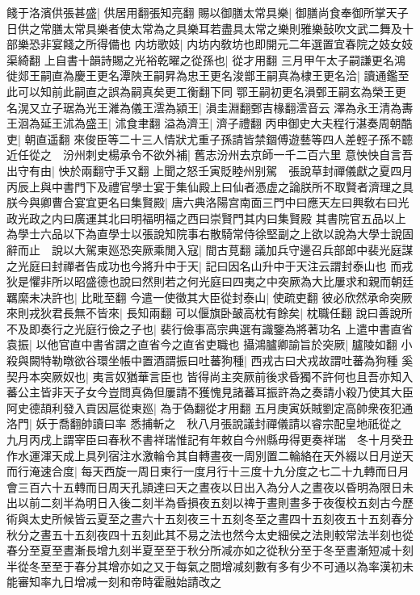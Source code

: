 餞于洛濱供張甚盛|{
	供居用翻張知亮翻}
賜以御膳太常具樂|{
	御膳尚食奉御所掌天子日供之常膳太常具樂者使太常為之具樂耳若盡具太常之樂則雅樂鼔吹文武二舞及十部樂恐非宴餞之所得備也}
内坊歌妓|{
	内坊内敎坊也即開元二年選置宜春院之妓女妓渠綺翻}
上自書十韻詩賜之光裕乾曜之從孫也|{
	從才用翻}
三月甲午太子嗣謙更名鴻徙郯王嗣直為慶王更名潭陜王嗣昇為忠王更名浚鄫王嗣真為棣王更名洽|{
	讀通鑑至此可以知前此嗣直之誤為嗣真矣更工衡翻下同}
鄂王嗣初更名溳鄄王嗣玄為榮王更名滉又立子琚為光王濰為儀王澐為潁王|{
	溳圭淵翻鄄吉椽翻澐音云}
澤為永王清為夀王洄為延王沭為盛王|{
	沭食聿翻}
溢為濟王|{
	濟子禮翻}
丙申御史大夫程行湛奏周朝酷吏|{
	朝直遥翻}
來俊臣等二十三人情狀尤重子孫請皆禁錮傅遊藝等四人差輕子孫不聼近任從之　汾州刺史楊承令不欲外補|{
	舊志汾州去京師一千二百六里}
意怏怏自言吾出守有由|{
	怏於兩翻守手又翻}
上聞之怒壬寅貶睦州别駕　張說草封禪儀獻之夏四月丙辰上與中書門下及禮官學士宴于集仙殿上曰仙者憑虚之論朕所不取賢者濟理之具朕今與卿曹合宴宜更名曰集賢殿|{
	唐六典洛陽宫南面三門中曰應天左曰興敎右曰光政光政之内曰廣運其北曰明福明福之西曰崇賢門其内曰集賢殿}
其書院官五品以上為學士六品以下為直學士以張說知院事右散騎常侍徐堅副之上欲以說為大學士說固辭而止　說以大駕東廵恐突厥乘閒入寇|{
	間古莧翻}
議加兵守邊召兵部郎中裴光庭謀之光庭曰封禪者告成功也今將升中于天|{
	記曰因名山升中于天注云謂封泰山也}
而戎狄是懼非所以昭盛德也說曰然則若之何光庭曰四夷之中突厥為大比屢求和親而朝廷羈縻未决許也|{
	比毗至翻}
今遣一使徵其大臣從封泰山|{
	使疏吏翻}
彼必欣然承命突厥來則戎狄君長無不皆來|{
	長知兩翻}
可以偃旗卧皷高枕有餘矣|{
	枕職任翻}
說曰善說所不及即奏行之光庭行儉之子也|{
	裴行儉事高宗典選有識鑒為將著功名}
上遣中書直省袁振|{
	以他官直中書省謂之直省今之直省吏職也}
攝鴻臚卿諭旨於突厥|{
	臚陵如翻}
小殺與闕特勒暾欲谷環坐帳中置酒謂振曰吐蕃狗種|{
	西戎古曰犬戎故謂吐蕃為狗種}
奚契丹本突厥奴也|{
	夷言奴猶華言臣也}
皆得尚主突厥前後求昏獨不許何也且吾亦知入蕃公主皆非天子女今豈問真偽但屢請不獲愧見諸蕃耳振許為之奏請小殺乃使其大臣阿史德頡利發入貢因扈從東廵|{
	為于偽翻從才用翻}
五月庚寅妖賊劉定高帥衆夜犯通洛門|{
	妖于喬翻帥讀曰率}
悉捕斬之　秋八月張說議封禪儀請以睿宗配皇地祇從之　九月丙戌上謂宰臣曰春秋不書祥瑞惟記有年敕自今州縣毋得更奏祥瑞　冬十月癸丑作水運渾天成上具列宿注水激輪令其自轉晝夜一周別置二輪絡在天外綴以日月逆天而行淹速合度|{
	每天西旋一周日東行一度月行十三度十九分度之七二十九轉而日月會三百六十五轉而日周天孔頴達曰天之晝夜以日出入為分人之晝夜以昏明為限日未出以前二刻半為明日入後二刻半為昏損夜五刻以禆于晝則晝多于夜復校五刻古今歷術與太史所候皆云夏至之晝六十五刻夜三十五刻冬至之晝四十五刻夜五十五刻春分秋分之晝五十五刻夜四十五刻此其不易之法也然今太史細侯之法則較常法半刻也從春分至夏至晝漸長增九刻半夏至至于秋分所减亦如之從秋分至于冬至晝漸短减十刻半從冬至至于春分其增亦如之又于每氣之間增减刻數有多有少不可通以為率漢初未能審知率九日增减一刻和帝時霍融始請改之}
